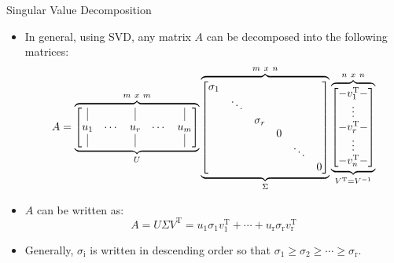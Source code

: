 \begin{frame}[t]{Singular Value Decomposition}
	\begin{itemize}
		\item In general, using SVD, any matrix $A$ can be decomposed into the
            following matrices:
		\begin{equation*}
			A
			=
            \overbrace{
			\underbrace{
			\begin{bmatrix}
				\vline &   & \vline &  & \vline \\
				u_1 & \cdots & u_r & \cdots & u_m \\
				\vline &   & \vline &  & \vline \\
			\end{bmatrix}
        }_{U}}^{ m~x~m}
            \overbrace{
			\underbrace{
			\begin{bmatrix}
				\sigma_1 & & & & & \\
				& \ddots & & & &  \\
				& & \sigma_r & & & \\
				& & & 0 & & \\
				& & & & \ddots & \\
				& & & & & 0\\
			\end{bmatrix}
        }_{\Sigma}}^{m~x~n}
            \overbrace{
			\underbrace{
			\begin{bmatrix}
                -v_1^{\text{T}}-  \\
				\vdots \\
                -v_r^{\text{T}}-\\
				\vdots\\
                -v_n^{\text{T}}-\\
			\end{bmatrix}
        }_{V^{\text{T}} = V^{-1}}}^{n~x~n}
		\end{equation*}
		\item $A$ can be written as:
		\begin{equation*}
            A = U \Sigma V^{\text{T}} = u_1 \sigma_1 v_1^{\text{T}} + \cdots +
            u_{\text{r}} \sigma_{\text{r}} v_{\text{r}}^{\text{T}}
		\end{equation*}
    \item Generally, $\sigma_{\text{i}}$ is written in descending order so that
        $\sigma_1 \geq \sigma_2 \geq \cdots \geq \sigma_{\text{r}}$.
	\end{itemize}
\end{frame}


